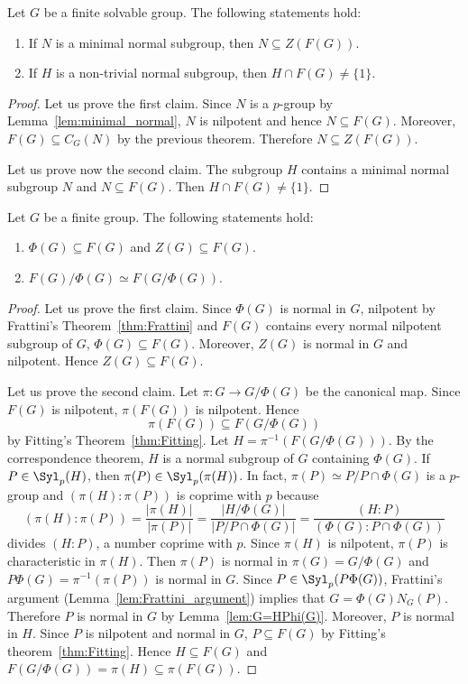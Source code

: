 \begin{corollary}
Let $G$ be a finite solvable group. The following statements hold: 
\begin{enumerate}
\item If $N$ is a minimal normal subgroup, then $N\subseteq Z(F(G))$. 
\item If $H$ is a non-trivial normal subgroup, then $H\cap F(G)\ne\{1\}$.
\end{enumerate}
\end{corollary}

\begin{proof}
Let us prove the first claim. Since $N$ is a $p$-group by Lemma~\ref{lem:minimal_normal}, 
$N$ is nilpotent and hence $N\subseteq F(G)$. Moreover, $F(G)\subseteq C_G(N)$ by the previous theorem. 
Therefore $N\subseteq Z(F(G))$. 

Let us prove now the second claim. The subgroup $H$ contains a minimal normal subgroup $N$ and 
$N\subseteq F(G)$. Then $H\cap F(G)\ne\{1\}$. 
\end{proof}

\begin{theorem}
Let $G$ be a finite group. The following statements hold:
\begin{enumerate}
\item $\Phi(G)\subseteq F(G)$ and $Z(G)\subseteq F(G)$.
\item $F(G)/\Phi(G)\simeq F(G/\Phi(G))$.
\end{enumerate}
\end{theorem}

\begin{proof}
Let us prove the first claim. Since $\Phi(G)$ is normal in $G$, nilpotent by 
Frattini's Theorem~\ref{thm:Frattini} and $F(G)$ contains every normal nilpotent subgroup of $G$, 
$\Phi(G)\subseteq F(G)$. Moreover, $Z(G)$ is normal in $G$ and nilpotent. Hence 
$Z(G)\subseteq F(G)$.

Let us prove the second claim. Let $\pi\colon G\to G/\Phi(G)$ be the canonical map. Since 
$F(G)$ is nilpotent, $\pi(F(G))$ is nilpotent. Hence 
\[
\pi(F(G))\subseteq F(G/\Phi(G))
\]
by Fitting's Theorem~\ref{thm:Fitting}. Let 
$H=\pi^{-1}(F(G/\Phi(G)))$. By the correspondence theorem, $H$ is a normal 
subgroup of $G$ containing $\Phi(G)$. If $P\in\Syl_p(H)$, then 
$\pi(P)\in\Syl_p(\pi(H))$. In fact, $\pi(P)\simeq P/P\cap \Phi(G)$ is a $p$-group and 
$(\pi(H):\pi(P))$ is coprime with $p$ because 
	\[
	(\pi(H):\pi(P))
	=\frac{|\pi(H)|}{|\pi(P)|}
	=\frac{|H/\Phi(G)|}{|P/P\cap \Phi(G)|}
	=\frac{(H:P)}{(\Phi(G):P\cap\Phi(G))}
	\]
divides $(H:P)$, a number coprime with $p$. Since $\pi(H)$ is nilpotent, 
$\pi(P)$ is characteristic in $\pi(H)$. Then $\pi(P)$ is normal
in $\pi(G)=G/\Phi(G)$ and $P\Phi(G)=\pi^{-1}(\pi(P))$ is normal 
in $G$. Since $P\in\Syl_p(P\Phi(G))$, Frattini's argument (Lemma~\ref{lem:Frattini_argument}) implies that 
$G=\Phi(G)N_G(P)$. Therefore $P$
is normal in $G$ by Lemma~\ref{lem:G=HPhi(G)}. Moreover, $P$ is normal in $H$. 
Since $P$ is nilpotent and normal in $G$, 
$P\subseteq F(G)$ by Fitting's theorem~\ref{thm:Fitting}. Hence 
$H\subseteq F(G)$ and 
$F(G/\Phi(G))=\pi(H)\subseteq \pi(F(G))$.
\end{proof}

